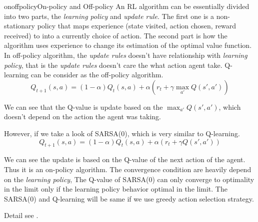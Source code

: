 \documentclass[9pt]{article}
\begin{document}
\begin{topic}{onoffpolicy}{On-policy and Off-policy}
An RL algorithm can be essentially divided into two parts, the \textit{learning policy} and \textit{update rule}. The first one is a non-stationary policy that maps experience (state visited, action chosen, reward received) to into a currently choice of action. The second part is how the algorithm uses experience to change its estimation of the optimal value function.
In off-policy algorithm, the \textit{update rules} doesn't have relationship with \textit{learning policy}, that is the \textit{update rules} doesn't care the what action agent take. Q-learning can be consider as the off-policy algorithm.
\begin{displaymath}
  Q_{t+1}(s,a) = (1-\alpha)Q_{t}(s,a)+\alpha(r_t+\gamma \max_{a'}Q(s',a'))
\end{displaymath}

We can see that the Q-value is update based on the $\max_{a'}Q(s',a')$, which doesn't depend on the action the agent was taking.

However, if we take a look of SARSA(0), which is very similar to Q-learning.
\begin{displaymath}
  Q_{t+1}(s,a) = (1-\alpha)Q_{t}(s,a)+\alpha(r_t+\gamma Q(s',a'))
\end{displaymath}

We can see the update is based on the Q-value of the next action of the agent. Thus it is an on-policy algorithm. The convergence condition are heavily depend on the \textit{learning policy}, The Q-value of SARSA(0) can only converge to optimality in the limit only if the learning policy behavior optimal in the limit. The SARSA(0) and Q-learning will be same if we use greedy action selection strategy.

Detail see \citep{singh2000convergence}.
\end{topic}
\end{document}
